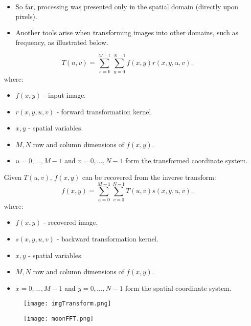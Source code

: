 \begin{frame}
\begin{itemize}
\item So far, processing was presented only in the spatial domain (directly upon pixels).
\item Another tools arise when transforming images into other domains, such as frequency, as illustrated below.
\end{itemize}
\begin{equation}
T(u,v) = \sum_{x=0}^{M-1}\sum_{y=0}^{N-1}f(x,y) r(x,y,u,v).
\end{equation}
where:
\begin{itemize}
\item $f(x,y)$ - input image.
\item $r(x,y,u,v)$ - forward transformation kernel.
\item $x, y$ - spatial variables.
\item $M, N$ row and column dimensions of $f(x,y)$.
\item $u=0,\ldots,M-1$ and $v=0,\ldots,N-1$ form the transformed coordinate system.
\end{itemize}
\end{frame}


\begin{frame}
Given $T(u,v)$, $f(x,y)$ can be recovered from the inverse transform:
\begin{equation}
f(x,y) = \sum_{u=0}^{M-1}\sum_{v=0}^{N-1}T(u,v) s(x,y,u,v).
\end{equation}
where:
\begin{itemize}
\item $f(x,y)$ - recovered image.
\item $s(x,y,u,v)$ - backward transformation kernel.
\item $x, y$ - spatial variables.
\item $M, N$ row and column dimensions of $f(x,y)$.
\item $x=0,\ldots,M-1$ and $y=0,\ldots,N-1$ form the spatial coordinate system.
\end{itemize}
\end{frame}


\begin{frame}
\begin{figure}
\centering
\texttt{[image: imgTransform.png]}
\end{figure}
\begin{figure}
\centering
\texttt{[image: moonFFT.png]}
\end{figure}
\end{frame}

